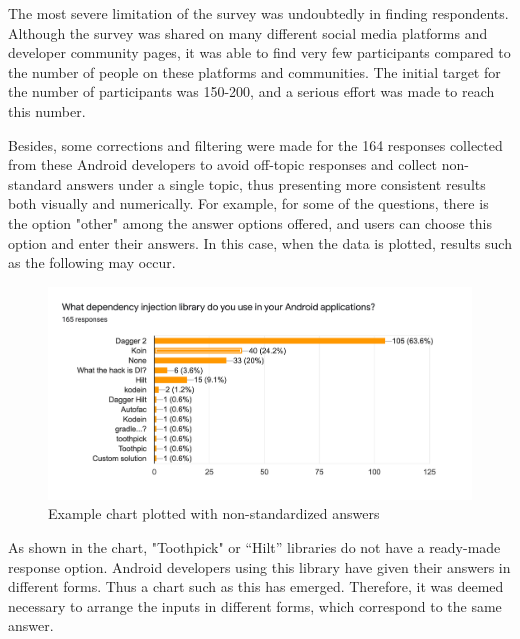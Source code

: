 The most severe limitation of the survey was undoubtedly in finding respondents. Although the survey was shared on many different social media platforms and developer community pages, it was able to find very few participants compared to the number of people on these platforms and communities. The initial target for the number of participants was 150-200, and a serious effort was made to reach this number.

Besides, some corrections and filtering were made for the 164 responses collected from these Android developers to avoid off-topic responses and collect non-standard answers under a single topic, thus presenting more consistent results both visually and numerically. For example, for some of the questions, there is the option "other" among the answer options offered, and users can choose this option and enter their answers. In this case, when the data is plotted, results such as the following may occur.
\begin{figure}[ht!]
    \centering
    \includegraphics[scale=0.20]{figures/non_standard.png}
    \caption{Example chart plotted with non-standardized answers}
    \label{fig:non_standard_chart_example}
\end{figure}

As shown in the chart, "Toothpick" or “Hilt” libraries do not have a ready-made response option. Android developers using this library have given their answers in different forms. Thus a chart such as this has emerged. Therefore, it was deemed necessary to arrange the inputs in different forms, which correspond to the same answer. 

